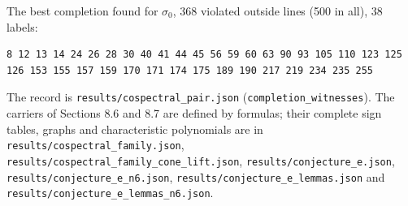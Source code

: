 \documentclass[11pt,a4paper]{article}
\begin{document}
The best completion found for \(\sigma_0\), 368 violated outside lines (500 in all), 38 labels:

\begin{verbatim}
8 12 13 14 24 26 28 30 40 41 44 45 56 59 60 63 90 93 105 110 123 125 126 153 155 157 159 170 171 174 175 189 190 217 219 234 235 255
\end{verbatim}

The record is \nolinkurl{results/cospectral_pair.json} (\nolinkurl{completion_witnesses}). The carriers of Sections 8.6 and
8.7 are defined by formulas; their complete sign tables, graphs and characteristic polynomials are in
\nolinkurl{results/cospectral_family.json}, \nolinkurl{results/cospectral_family_cone_lift.json},
\nolinkurl{results/conjecture_e.json}, \nolinkurl{results/conjecture_e_n6.json}, \nolinkurl{results/conjecture_e_lemmas.json} and
\nolinkurl{results/conjecture_e_lemmas_n6.json}.
\end{document}
